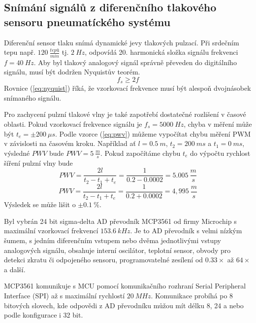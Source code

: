 \subsection{Snímání signálů z diferenčního tlakového sensoru pneumatíckého systému} \label{section:mcp3561_hw}
Diferenční sensor tlaku snímá dynamické jevy tlakových pulzací. Při srdečním tepu např. $120 \ \frac{tepů}{min}$ tj. $2 \ Hz$, odpovídá 20. harmonická složka signálu frekvenci  $f = 40 \ Hz$. Aby byl tlakový analogový signál správně převeden do digitálního signálu, musí být dodržen Nyquistův teorém.
\begin{equation} \label{eq:nyquist}
    f_s \geq 2f
\end{equation}
Rovnice (\ref{eq:nyquist}) říká, že vzorkovací frekvence musí být alespoň dvojnásobek snímaného signálu.
\par
Pro zachycení pulzní tlakové vlny je také zapotřebí dostatečné rozlišení v časové oblasti. Pokud vzorkovací frekvence signálu je $f_s = 5000 \ Hz$, chyba v měření může být $t_e = \pm 200 \ \mu s$. Podle vzorce (\ref{eq:pwv}) můžeme vypočítat chybu měření PWM v závislosti na časovém kroku.
Například ať $l = 0.5 \ m$, $t_2 = 200 \ ms$ a $t_1 = 0 \ ms$, výsledné $PWV$ bude $PWV = 5 \ \frac{m}{s}$. Pokud započítáme chybu $t_e$ do výpočtu rychlost šíření pulzní vlny bude
\begin{equation*}
    PWV = \frac{2l}{t_2 - t_1 + t_e} = \frac{1}{0.2 - 0.0002} = 5.005 \ \frac{m}{s}
\end{equation*}
\begin{equation*}
    PWV = \frac{2l}{t_2 - t_1 + t_e} = \frac{1}{0.2 + 0.0002} = 4,995 \ \frac{m}{s}
\end{equation*}
Výsledek se může lišit o $\pm 0.1 \ \%$.
\par
Byl vybrán 24 bit sigma-delta AD převodník MCP3561 od firmy Microchip s maximální vzorkovací frekvencí $153.6 \ kHz$. Je to AD převodník s velmi nízkým šumem, s jedním diferenčním vstupem nebo dvěma jednotlivými vstupy analogových signálu,
obsahuje interní oscilátor, teplotní sensor, obvody pro detekci zkratu či odpojeného sensoru, programovatelné zesílení od $0.33 \times$ až $64 \times$ a další.
\par
MCP3561 komunikuje s MCU pomocí komunikačního rozhraní Serial Peripheral Interface (SPI) až s maximální rychlostí $20 \ MHz$. Komunikace probíhá po 8 bitových slovech, kde odpovědi z AD převodníku můžou mít délku 8, 24 a nebo podle konfigurace i 32 bit.

